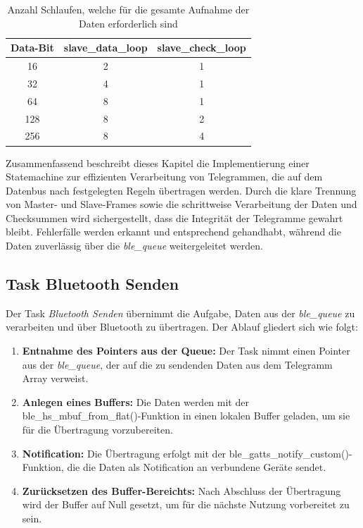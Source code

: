\begin{table}[H]
    \centering
    \begin{tabular}{c|c|c}
        Data-Bit & slave\_data\_loop & slave\_check\_loop\\
        \hline
        \hline
        16 & 2 & 1\\
        \hline
        32 & 4 & 1\\
        \hline
        64 & 8 & 1\\
        \hline
        128 & 8 & 2\\
        \hline
        256 & 8 & 4\\
        \hline
    \end{tabular}
    \caption{Anzahl Schlaufen, welche für die gesamte Aufnahme der Daten erforderlich sind}
    \label{tab:SchlaufenSlaveLoops}
\end{table}


Zusammenfassend beschreibt dieses Kapitel die Implementierung einer Statemachine zur effizienten Verarbeitung von Telegrammen, die auf dem Datenbus nach festgelegten Regeln übertragen werden. Durch die klare Trennung von Master- und Slave-Frames sowie die schrittweise Verarbeitung der Daten und Checksummen wird sichergestellt, dass die Integrität der Telegramme gewahrt bleibt. Fehlerfälle werden erkannt und entsprechend gehandhabt, während die Daten zuverlässig über die \textit{ble\_queue} weitergeleitet werden.


\subsection{Task Bluetooth Senden}
\label{sub:TaskBTSend}

Der Task \textit{Bluetooth Senden} übernimmt die Aufgabe, Daten aus der \textit{ble\_queue} zu verarbeiten und über Bluetooth zu übertragen. Der Ablauf gliedert sich wie folgt:

\begin{enumerate}
    \item \textbf{Entnahme des Pointers aus der Queue:}  
    Der Task nimmt einen Pointer aus der \textit{ble\_queue}, der auf die zu sendenden Daten aus dem Telegramm Array verweist.
    
    \item \textbf{Anlegen eines Buffers:}  
    Die Daten werden mit der ble\_hs\_mbuf\_from\_flat()-Funktion in einen lokalen Buffer geladen, um sie für die Übertragung vorzubereiten.
    
    \item \textbf{Notification:}  
    Die Übertragung erfolgt mit der ble\_gatts\_notify\_custom()- Funktion, die die Daten als Notification an verbundene Geräte sendet.
    
    \item \textbf{Zurücksetzen des Buffer-Bereichts:}  
    Nach Abschluss der Übertragung wird der Buffer auf Null gesetzt, um für die nächste Nutzung vorbereitet zu sein.
\end{enumerate}

